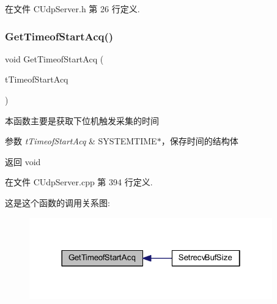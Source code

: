 在文件 C\+Udp\+Server.\+h 第 26 行定义.

\mbox{\label{class_c_udp_server_ae64df8898d87418be839fed707cebe57}} 
\subsubsection{\texorpdfstring{Get\+Timeof\+Start\+Acq()}{GetTimeofStartAcq()}}
{\footnotesize\ttfamily void Get\+Timeof\+Start\+Acq (\begin{DoxyParamCaption}\item[{S\+Y\+S\+T\+E\+M\+T\+I\+ME $\ast$}]{t\+Timeof\+Start\+Acq }\end{DoxyParamCaption})}



本函数主要是获取下位机触发采集的时间 


\begin{DoxyParams}{参数}
{\em t\+Timeof\+Start\+Acq} & S\+Y\+S\+T\+E\+M\+T\+I\+M\+E$\ast$，保存时间的结构体 \\
\hline
\end{DoxyParams}
\begin{DoxyReturn}{返回}
void 
\end{DoxyReturn}


在文件 C\+Udp\+Server.\+cpp 第 394 行定义.

这是这个函数的调用关系图\+:\nopagebreak
\begin{figure}[H]
\begin{center}
\leavevmode
\includegraphics[width=298pt]{class_c_udp_server_ae64df8898d87418be839fed707cebe57_icgraph}
\end{center}
\end{figure}
\mbox{\label{class_c_udp_server_a21fbbdcc6e88473bae9488405dcc9b95}} 
